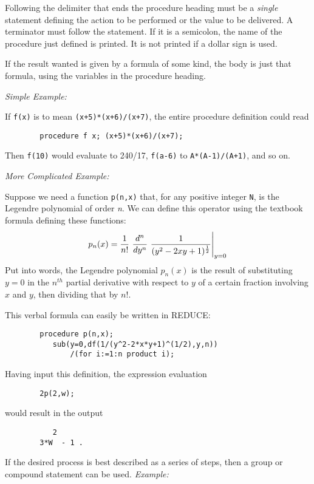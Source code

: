 \documentclass[11pt,letterpaper]{book}
\newcommand{\REDUCE}{REDUCE}
\newcommand{\extendedmanual}[1]{#1}
\begin{document}
Following the delimiter that ends the procedure heading must be a {\em
single} statement defining the action to be performed or the value to be
delivered.  A terminator must follow the statement.  If it is a semicolon,
the name of the procedure just defined is printed.  It is not printed if a
dollar sign is used.

If the result wanted is given by a formula of some kind, the body is just
that formula, using the variables in the procedure heading.

{\it Simple Example:}

If {\tt f(x)} is to mean {\tt (x+5)*(x+6)/(x+7)}, the entire procedure
definition could read
{\small\begin{verbatim}
        procedure f x; (x+5)*(x+6)/(x+7);
\end{verbatim}}
Then {\tt f(10)} would evaluate to 240/17, {\tt f(a-6)} to
{\tt A*(A-1)/(A+1)}, and so on.

{\it More Complicated Example:}

Suppose we need a function {\tt p(n,x)} that, for any positive integer
{\tt N}, is the Legendre polynomial of order
{\em n}. We can define this operator using the
textbook formula defining these functions:
\begin{displaymath}
p_n(x) = \displaystyle{1\over{n!}}\
\displaystyle{d^n\over dy^n}\ \displaystyle{{1\over{(y^2 - 2xy + 1)
^{{1\over2}}}}}\Bigg\vert_{y=0}
\end{displaymath}
Put into words, the Legendre polynomial $p_n(x)$ is the result of
substituting $y=0$ in the $n^{th}$ partial derivative with respect to $y$
of a certain fraction involving $x$ and $y$, then dividing that by $n!$.

This verbal formula can easily be written in {\REDUCE}:
{\small\begin{verbatim}
        procedure p(n,x);
           sub(y=0,df(1/(y^2-2*x*y+1)^(1/2),y,n))
               /(for i:=1:n product i);
\end{verbatim}}
Having input this definition, the expression evaluation
{\small\begin{verbatim}
        2p(2,w);
\end{verbatim}}
would result in the output
{\small\begin{verbatim}
           2
        3*W  - 1 .
\end{verbatim}}
If the desired process is best described as a series of steps, then a group
or compound statement can be used.
\extendedmanual{\newpage}
{\it Example:}
\end{document}
